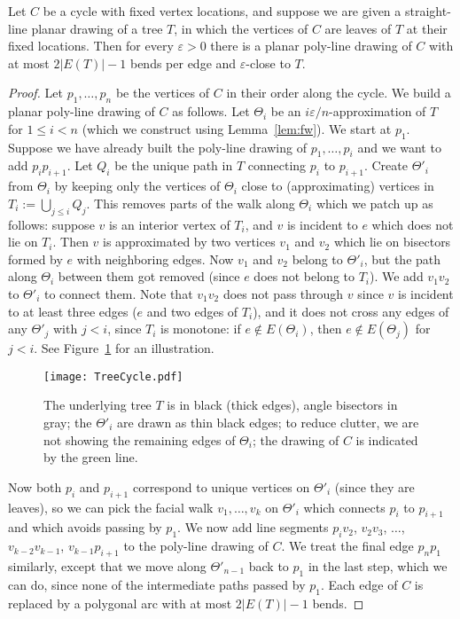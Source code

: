 \documentclass{llncs}
\begin{document}
\begin{lemma}
\label{lem:HCemb}
 Let $C$ be a cycle with fixed vertex locations, and suppose we are given a straight-line planar drawing of a tree $T$, in which the vertices of $C$ are leaves of $T$ at their fixed locations. Then for every $\varepsilon > 0$ there is a planar poly-line drawing of $C$ with at most $2|E(T)|-1$ bends per edge and $\varepsilon$-close to $T$.
\end{lemma}

\begin{proof}
 Let $p_1, \ldots, p_n$ be the vertices of $C$ in their order along the cycle. We build a planar poly-line drawing of $C$ as follows. Let $\Theta_i$ be an $i \varepsilon/n$-approximation of $T$ for $1 \leq i < n$ (which we construct using Lemma~\ref{lem:fw}). We start at $p_1$. Suppose we have already built the poly-line drawing of $p_1, \ldots, p_i$ and we want to add $p_ip_{i+1}$. Let $Q_i$ be the unique path in $T$ connecting  $p_i$ to $p_{i+1}$. Create $\Theta'_i$ from $\Theta_i$ by keeping only the vertices of $\Theta_i$ close to (approximating)
 vertices in $T_i := \bigcup_{j\leq i} Q_j$.
 This removes parts of the walk along $\Theta_i$ which we patch up as follows: suppose $v$ is an interior vertex of $T_i$, and
 $v$ is incident to $e$ which does not lie on $T_i$. Then $v$ is approximated by two vertices $v_1$ and $v_2$ which lie on bisectors formed by $e$ with neighboring edges. Now $v_1$ and $v_2$ belong to $\Theta'_i$, but the path along $\Theta_i$ between them got removed (since $e$ does not belong to $T_i$). We
 add $v_1v_2$ to $\Theta'_i$ to connect them. Note that $v_1v_2$ does not pass through $v$ since $v$ is incident to at least three edges ($e$ and two edges of $T_i$), and it does not cross any edges of any $\Theta'_j$ with $j<i$, since $T_i$ is monotone: if $e \not \in E(\Theta_i)$, then $e \not\in E(\Theta_j)$ for $j<i$. See Figure~\ref{fig:treecycle} for an illustration.
\begin{figure}[tb]
\centering
\texttt{[image: TreeCycle.pdf]}
\caption{The underlying tree $T$ is in black (thick edges), angle bisectors in gray; the $\Theta'_i$ are drawn as thin black edges; to reduce clutter, we are not showing the remaining edges of $\Theta_i$; the drawing of $C$ is indicated by the green line.}
\label{fig:treecycle}
\end{figure}
Now both $p_i$ and $p_{i+1}$ correspond to unique vertices on $\Theta'_i$ (since they are leaves), so we can pick the facial walk $v_1, \ldots, v_k$ on $\Theta'_i$ which connects $p_i$ to $p_{i+1}$ and which avoids passing by $p_1$. We now add line segments
 $p_iv_2$, $v_2v_3$, $\ldots$, $v_{k-2}v_{k-1}$, $v_{k-1}p_{i+1}$ to the
 poly-line drawing of $C$. We treat the final edge $p_np_1$ similarly, except that we move along $\Theta'_{n-1}$ back to $p_1$ in the last step,
 which we can do, since none of the intermediate paths passed by $p_1$. Each edge of $C$ is replaced by a polygonal arc with at most $2|E(T)|-1$ bends.
\end{proof}
\end{document}
